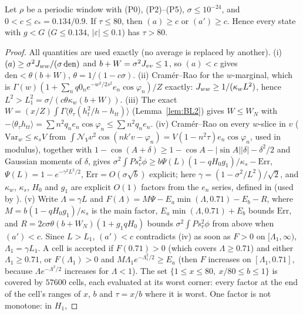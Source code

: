 \begin{lemma} 
\label{lem:BK1}
Let $\rho$ be a periodic window with (P0), (P2)--(P5), $\sigma\le10^{-24}$, and $0<c\le c_*=0.134/0.9$. If $\tau\le80$, then
$(a)\ge c$ or $(a')\ge c$. Hence every state with $g<G$ ($G\le0.134$, $|\varepsilon|\le0.1$) has $\tau>80$.
\end{lemma}
\begin{proof}
All quantities are used exactly (no average is replaced by another). (i) $(a)\ge\sigma^2J_{ww}/(\sigma\,\mathrm{den})$ and $b+W=\sigma^2J_{vv}\le1$, so
$(a)<c$ gives $\mathrm{den}<\theta(b+W)$, $\theta=1/(1-c\sigma)$. (ii) Cram\'er--Rao for the $w$-marginal, which is
$\Gamma(w)(1+\sum_nq0_ne^{-w^2/2s^2}e_n\cos\varphi_n)/Z$ exactly: $J_{ww}\ge1/(\kappa_wL^2)$, hence $L^2>L_1^2=\sigma/(c\theta\kappa_w(b+W))$. (iii) The exact
$W=(x/Z)\int\Gamma\langle\theta_\tau(h_t^2/h-h_{tt})\rangle$ (Lemma~\ref{lem:BL2}) gives $W\le W_N$ with $-\langle\theta_\tau h_{tt}\rangle=\sum n^2q_ne_n\cos\varphi_n\le\sum n^2q_ne_n$.
(iv) Cram\'er--Rao on every $w$-slice in $v$ ($\mathrm{Var}_w\le\kappa_sV$ from $\int\mathcal N_Vv^2\cos(nk'v-\varphi_n)=V(1-n^2\tau)e_n\cos\varphi_n$, used in modulus), together with
$1-\cos(A+\delta)\ge1-\cos A-|\sin A||\delta|-\delta^2/2$ and Gaussian moments of $\delta$, gives $\sigma^2\int Ps_v^2\phi\ge b\Psi(L)(1-qH_0g_1)/\kappa_s-\mathrm{Err}$,
$\Psi(L)=1-e^{-\gamma^2L^2/2}$, $\mathrm{Err}=O(\sigma\sqrt b)$ explicit; here $\gamma=(1-\sigma^2/L^2)/\sqrt2$, and $\kappa_w$, $\kappa_s$, $H_0$ and $g_1$ are explicit $O(1)$ factors from the $e_n$ series, defined in  (used by ). (v) Write $\Lambda=\gamma L$ and $F(\Lambda)=M\Psi-E_a\min(\Lambda,0.71)-E_b-R$, where $M=b(1-qH_0g_1)/\kappa_s$ is the main factor,
$E_a\min(\Lambda,0.71)+E_b$ bounds $\mathrm{Err}$, and $R=2c\sigma\theta(b+W_N)(1+g_1qH_0)$ bounds $\sigma^2\int Ps_v^2\phi$ from above when $(a')<c$. Since
$L>L_1$, $(a')<c$ contradicts (iv) as soon as $F>0$ on $[\Lambda_1,\infty)$, $\Lambda_1=\gamma L_1$. A cell is accepted if $F(0.71)>0$ (which covers
$\Lambda\ge0.71$) and either $\Lambda_1\ge0.71$, or $F(\Lambda_1)>0$ and $M\Lambda_1e^{-\Lambda_1^2/2}\ge E_a$ (then $F$ increases on $[\Lambda_1,0.71]$,
because $\Lambda e^{-\Lambda^2/2}$ increases for $\Lambda<1$). The set $\{1\le x\le80,\ x/80\le b\le1\}$ is covered by $57600$ cells, each evaluated at
its worst corner: every factor at the end of the cell's ranges of $x$, $b$ and $\tau=x/b$ where it is worst. One factor is not monotone: in $H_1$,

\end{proof}
